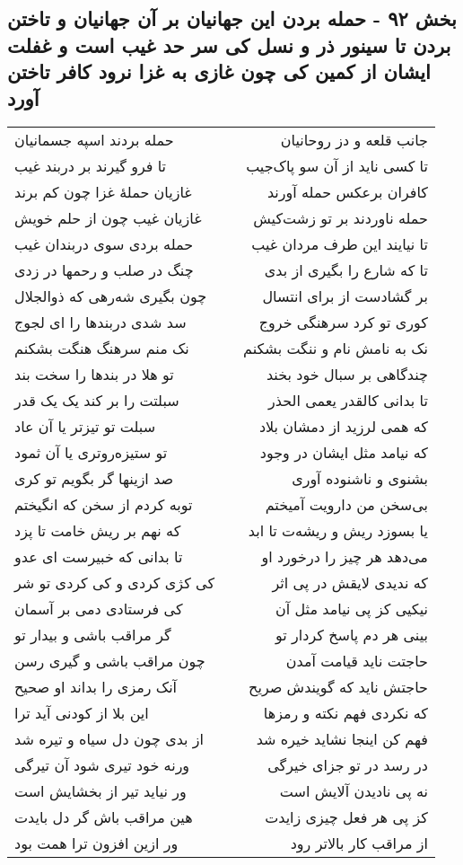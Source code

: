 \begin{center}
\section*{بخش ۹۲ - حمله بردن این جهانیان بر آن  جهانیان و تاختن بردن تا  سینور ذر و نسل کی سر حد غیب است و غفلت ایشان از کمین کی چون غازی به غزا نرود کافر تاختن آورد}
\label{sec:sh092}
\begin{longtable}{l p{0.5cm} r}
حمله بردند اسپه جسمانیان
&&
جانب قلعه و دز روحانیان
\\
تا فرو گیرند بر دربند غیب
&&
تا کسی ناید از آن سو پاک‌جیب
\\
غازیان حملهٔ غزا چون کم برند
&&
کافران برعکس حمله آورند
\\
غازیان غیب چون از حلم خویش
&&
حمله ناوردند بر تو زشت‌کیش
\\
حمله بردی سوی دربندان غیب
&&
تا نیایند این طرف مردان غیب
\\
چنگ در صلب و رحمها در زدی
&&
تا که شارع را بگیری از بدی
\\
چون بگیری شه‌رهی که ذوالجلال
&&
بر گشادست از برای انتسال
\\
سد شدی دربندها را ای لجوج
&&
کوری تو کرد سرهنگی خروج
\\
نک منم سرهنگ هنگت بشکنم
&&
نک به نامش نام و ننگت بشکنم
\\
تو هلا در بندها را سخت بند
&&
چندگاهی بر سبال خود بخند
\\
سبلتت را بر کند یک یک قدر
&&
تا بدانی کالقدر یعمی الحذر
\\
سبلت تو تیزتر یا آن عاد
&&
که همی لرزید از دمشان بلاد
\\
تو ستیزه‌روتری یا آن ثمود
&&
که نیامد مثل ایشان در وجود
\\
صد ازینها گر بگویم تو کری
&&
بشنوی و ناشنوده آوری
\\
توبه کردم از سخن که انگیختم
&&
بی‌سخن من دارویت آمیختم
\\
که نهم بر ریش خامت تا پزد
&&
یا بسوزد ریش و ریشه‌ت تا ابد
\\
تا بدانی که خبیرست ای عدو
&&
می‌دهد هر چیز را درخورد او
\\
کی کژی کردی و کی کردی تو شر
&&
که ندیدی لایقش در پی اثر
\\
کی فرستادی دمی بر آسمان
&&
نیکیی کز پی نیامد مثل آن
\\
گر مراقب باشی و بیدار تو
&&
بینی هر دم پاسخ کردار تو
\\
چون مراقب باشی و گیری رسن
&&
حاجتت ناید قیامت آمدن
\\
آنک رمزی را بداند او صحیح
&&
حاجتش ناید که گویندش صریح
\\
این بلا از کودنی آید ترا
&&
که نکردی فهم نکته و رمزها
\\
از بدی چون دل سیاه و تیره شد
&&
فهم کن اینجا نشاید خیره شد
\\
ورنه خود تیری شود آن تیرگی
&&
در رسد در تو جزای خیرگی
\\
ور نیاید تیر از بخشایش است
&&
نه پی نادیدن آلایش است
\\
هین مراقب باش گر دل بایدت
&&
کز پی هر فعل چیزی زایدت
\\
ور ازین افزون ترا همت بود
&&
از مراقب کار بالاتر رود
\\
\end{longtable}
\end{center}
